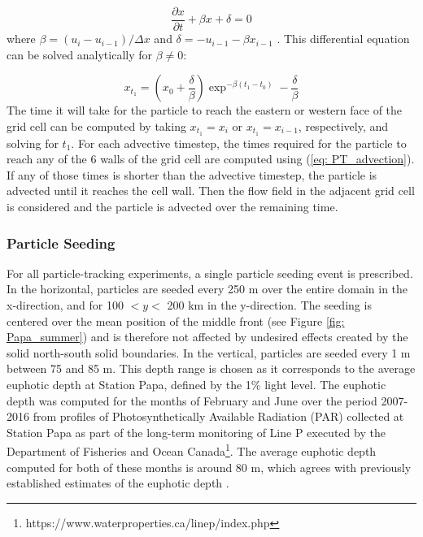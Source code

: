 \documentclass[draft,linenumbers]{agujournal2018}
\begin{document}
\begin{equation}
\frac{\partial x}{\partial t} + \beta x + \delta =  0
\label{eq: eq_diff}
\end{equation}
where $\beta = (u_{i}-u_{i-1})/\Delta x$ and $\delta = -u_{i-1} - \beta x_{i-1}$ \citep{Doos_2013}. This differential equation can be solved analytically for $\beta \neq 0$:

\begin{equation}
x_{t_1} = \left(x_0 + \frac{\delta}{\beta}\right)\exp^{-\beta(t_1 - t_0)} - \frac{\delta}{\beta}
\label{eq: PT_advection}
\end{equation}
The time it will take for the particle to reach the eastern or western face of the grid cell can be computed by taking $x_{t_1} = x_i$ or $x_{t_1} = x_{i-1}$, respectively, and solving for $t_1$. For each advective timestep, the times required for the particle to reach any of the 6 walls of the grid cell are computed using (\ref{eq: PT_advection}). If any of those times is shorter than the advective timestep, the particle is advected until it reaches the cell wall. Then the flow field in the adjacent grid cell is considered and the particle is advected over the remaining time. 

\subsubsection{Particle Seeding}

For all particle-tracking experiments, a single particle seeding event is prescribed. In the horizontal, particles are seeded every 250 m over the entire domain in the x-direction, and for 100 $<y<$ 200 km in the y-direction. The seeding is centered over the mean position of the middle front (see Figure \ref{fig: Papa_summer}) and is therefore not affected by undesired effects created by the solid north-south solid boundaries. In the vertical, particles are seeded every 1 m between 75 and 85 m. This depth range is chosen as it corresponds to the average euphotic depth at Station Papa, defined by the 1\% light level. The euphotic depth was computed for the months of February and June over the period 2007-2016 from profiles of Photosynthetically Available Radiation (PAR) collected at Station Papa as part of the long-term monitoring of Line P executed by the Department of Fisheries and Ocean Canada\footnote{https://www.waterproperties.ca/linep/index.php}. The average euphotic depth computed for both of these months is around 80 m, which agrees with previously established estimates of the euphotic depth \citep{Sherry_1999,Harrison_2004}.
\end{document}
